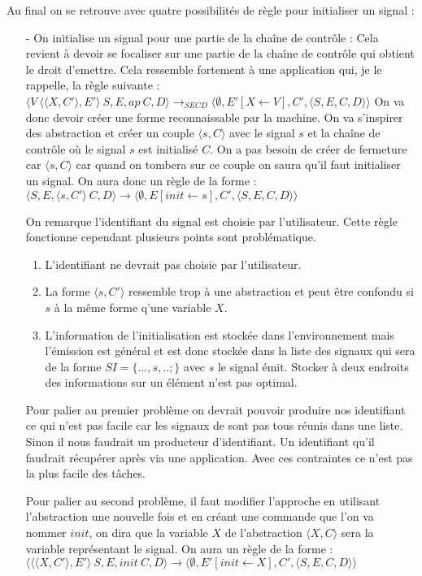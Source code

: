 \documentclass[10pt,a4paper]{report}
\begin{document}
	Au final on se retrouve avec quatre possibilités de règle pour initialiser un signal :
	\smallbreak
	\begin{itemize}
		\item[-] On initialise un signal pour une partie de la chaîne de contrôle : Cela revient à devoir se focaliser sur une partie de la chaîne de contrôle qui obtient le droit d'emettre. Cela ressemble fortement à une application qui, je le rappelle, la règle suivante : 
		\smallbreak
		$\langle V~\langle\langle X,C'\rangle,E'\rangle~S,E,ap~C,D\rangle
		\longrightarrow_{SECD} 
		\langle \emptyset,E'[X \leftarrow V],C',\langle S,E,C,D\rangle\rangle$
		\smallbreak
		On va donc devoir créer une forme reconnaissable par la machine. On va s'inspirer des abstraction et créer un couple $\langle s,C\rangle$ avec le signal $s$ et la chaîne de contrôle où le signal $s$ est initialisé $C$. On a pas besoin de créer de fermeture car $\langle s,C\rangle$ car quand on tombera sur ce couple on saura qu'il faut initialiser un signal. On aura donc un règle de la forme : 
		\smallbreak
		$\langle S,E,\langle s,C'\rangle~C,D\rangle
		\longrightarrow 
		\langle \emptyset,E[init \leftarrow s],C',\langle S,E,C,D\rangle\rangle$
		\medbreak
		
		On remarque l'identifiant du signal est choisie par l'utilisateur. Cette règle fonctionne cependant plusieurs points sont problématique. 
		\begin{enumerate}
			\item L'identifiant ne devrait pas choisie par l'utilisateur.
			\item La forme $\langle s,C'\rangle$ ressemble trop à une abstraction et peut être confondu si $s$ à la même forme q'une variable $X$. 
			\item L'information de l'initialisation est stockée dans l'environnement mais l'émission est général et est donc stockée dans la liste des signaux qui sera de la forme $SI = \{...,s,..;\}$ avec $s$ le signal émit. Stocker à deux endroits des informations sur un élément n'est pas optimal.
		\end{enumerate}
		\medbreak
		
		Pour palier au premier problème on devrait pouvoir produire nos identifiant ce qui n'est pas facile car les signaux de sont pas tous réunis dans une liste. Sinon il nous faudrait un producteur d'identifiant. Un identifiant qu'il faudrait récupérer après via une application. Avec ces contraintes ce n'est pas la plus facile des tâches.
		\medbreak
		
		Pour palier au second problème, il faut modifier l'approche en utilisant l'abstraction une nouvelle fois et en créant une commande que l'on va nommer $init$, on dira que la variable $X$ de l'abstraction $\langle X,C\rangle$ sera la variable représentant le signal. On aura un règle de la forme : 
		\smallbreak
		$\langle \langle\langle X,C'\rangle,E'\rangle~S,E,init~C,D\rangle
		\longrightarrow 
		\langle \emptyset,E'[init \leftarrow X],C',\langle S,E,C,D\rangle\rangle$
		\medbreak
		

\end{itemize}
\end{document}
